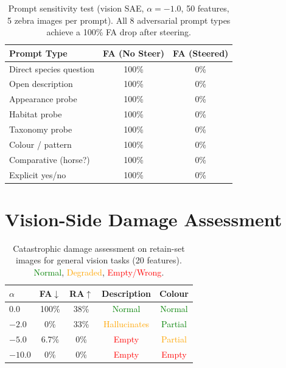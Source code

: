 \documentclass{article}
\begin{document}
\begin{table}[ht]
\caption{Prompt sensitivity test (vision SAE, $\alpha=-1.0$, 50 features,
         5 zebra images per prompt). All 8 adversarial prompt types
         achieve a 100\% FA drop after steering.}
\label{tab:prompts}
\vskip 0.15in
\begin{center}
\begin{small}
\begin{tabular}{lcc}
\toprule
\textbf{Prompt Type} & \textbf{FA (No Steer)} & \textbf{FA (Steered)} \\
\midrule
Direct species question  & 100\% & 0\% \\
Open description         & 100\% & 0\% \\
Appearance probe         & 100\% & 0\% \\
Habitat probe            & 100\% & 0\% \\
Taxonomy probe           & 100\% & 0\% \\
Colour / pattern         & 100\% & 0\% \\
Comparative (horse?)     & 100\% & 0\% \\
Explicit yes/no          & 100\% & 0\% \\
\bottomrule
\end{tabular}
\end{small}
\end{center}
\vskip -0.1in
\end{table}

\section{Vision-Side Damage Assessment}
\label{app:damage}

\begin{table}[ht]
\caption{Catastrophic damage assessment on retain-set images for
         general vision tasks (20 features). \textcolor{green}{Normal},
         \textcolor{orange}{Degraded}, \textcolor{red}{Empty/Wrong}.}
\label{tab:damage}
\vskip 0.15in
\begin{center}
\begin{small}
\begin{tabular}{lcccc}
\toprule
\textbf{$\alpha$} & \textbf{FA$\downarrow$}
  & \textbf{RA$\uparrow$} & \textbf{Description} & \textbf{Colour} \\
\midrule
$0.0$ & 100\% & 38\%
  & \textcolor{green}{Normal} & \textcolor{green}{Normal} \\
$-2.0$ & 0\% & 33\%
  & \textcolor{orange}{Hallucinates} & \textcolor{green}{Partial} \\
$-5.0$ & 6.7\% & 0\%
  & \textcolor{red}{Empty} & \textcolor{orange}{Partial} \\
$-10.0$ & 0\% & 0\%
  & \textcolor{red}{Empty} & \textcolor{red}{Empty} \\
\bottomrule
\end{tabular}
\end{small}
\end{center}
\vskip -0.1in
\end{table}
\end{document}
